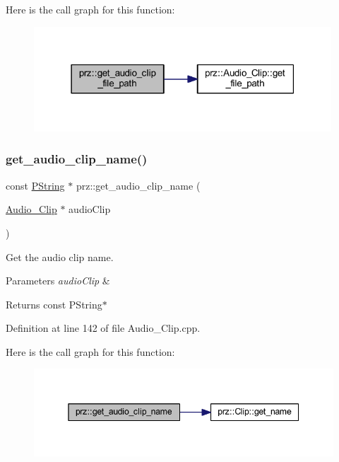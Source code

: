 Here is the call graph for this function\+:
\nopagebreak
\begin{figure}[H]
\begin{center}
\leavevmode
\includegraphics[width=316pt]{namespaceprz_a1e56bb34b7529aa4bebbc720221ab7c8_cgraph}
\end{center}
\end{figure}
\mbox{\label{namespaceprz_a34ace91843bd282282f609752f6ba309}} 
\subsubsection{\texorpdfstring{get\_audio\_clip\_name()}{get\_audio\_clip\_name()}}
{\footnotesize\ttfamily const \mbox{\hyperlink{classprz_1_1_p_string}{P\+String}} $\ast$ prz\+::get\+\_\+audio\+\_\+clip\+\_\+name (\begin{DoxyParamCaption}\item[{\mbox{\hyperlink{classprz_1_1_audio___clip}{Audio\+\_\+\+Clip}} $\ast$}]{audio\+Clip }\end{DoxyParamCaption})}



Get the audio clip name. 


\begin{DoxyParams}{Parameters}
{\em audio\+Clip} & \\
\hline
\end{DoxyParams}
\begin{DoxyReturn}{Returns}
const P\+String$\ast$ 
\end{DoxyReturn}


Definition at line 142 of file Audio\+\_\+\+Clip.\+cpp.

Here is the call graph for this function\+:
\nopagebreak
\begin{figure}[H]
\begin{center}
\leavevmode
\includegraphics[width=345pt]{namespaceprz_a34ace91843bd282282f609752f6ba309_cgraph}
\end{center}
\end{figure}
\mbox{\label{namespaceprz_a80b9123c3664ba7b0e6bcceed4362dfc}} 
